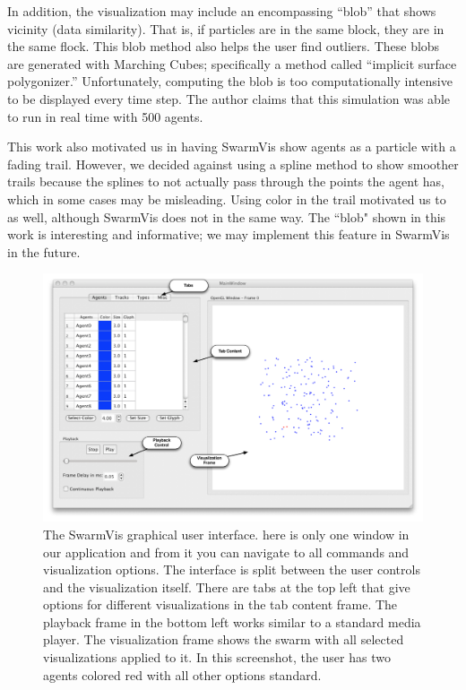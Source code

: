 \documentclass[conference]{IEEEtran}
\begin{document}
In addition, the visualization may include an encompassing ``blob'' that shows vicinity (data similarity). That is, if particles are in the same block, they are in the same flock. This blob method also helps the user find outliers.  
These blobs are generated with Marching Cubes; specifically a method called ``implicit surface polygonizer.'' Unfortunately, computing the blob is too computationally intensive to be displayed every time step.  
The author claims that this simulation was able to run in real time with 500 agents.

This work also motivated us in having SwarmVis show agents as a particle with a fading trail.
However, we decided against using a spline method to show smoother trails because the splines to not actually
pass through the points the agent has, which in some cases may be misleading.
Using color in the trail motivated us to as well, although SwarmVis does not in the same way.
The ``blob" shown in this work is interesting and informative; we may implement this feature in SwarmVis in the future.


\begin{figure}[ht]
\centering
\includegraphics[scale=.45]{images/swarmvis-annotated.pdf}
\caption{The SwarmVis graphical user interface. 
here is only one window in our application and from it you can navigate to all commands and visualization options.
The interface is split between the user controls and the visualization itself. There are tabs at the top left that give
options for different visualizations in the tab content frame. The playback frame in the bottom left works similar to a
standard media player. The visualization frame shows the swarm with all selected visualizations applied to it. In this
screenshot, the user has two agents colored red with all other options standard. }
\label{AnnotatedWindow}
\end{figure}
\end{document}
